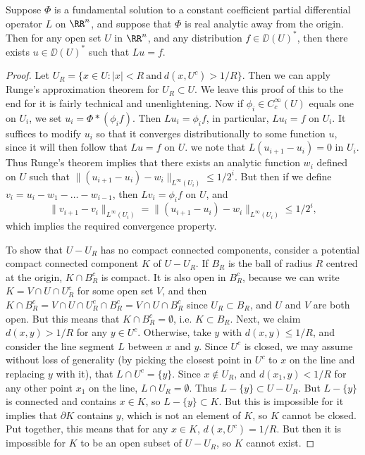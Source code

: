 \begin{theorem}
    Suppose $\Phi$ is a fundamental solution to a constant coefficient partial differential operator $L$ on $\RR^n$, and suppose that $\Phi$ is real analytic away from the origin. Then for any open set $U$ in $\RR^n$, and any distribution $f \in \DD(U)^*$, then there exists $u \in \DD(U)^*$ such that $Lu = f$.
\end{theorem}
\begin{proof}
    Let $U_R = \{ x \in U: |x| < R\ \text{and}\ d(x,U^c) > 1/R \}$. Then we can apply Runge's approximation theorem for $U_R \subset U$. We leave this proof of this to the end for it is fairly technical and unenlightening. Now if $\phi_i \in C_c^\infty(U)$ equals one on $U_i$, we set $u_i = \Phi * (\phi_i f)$. Then $Lu_i = \phi_i f$, in particular, $Lu_i = f$ on $U_i$. It suffices to modify $u_i$ so that it converges distributionally to some function $u$, since it will then follow that $Lu = f$ on $U$. we note that $L(u_{i+1} - u_i) = 0$ in $U_i$. Thus Runge's theorem implies that there exists an analytic function $w_i$ defined on $U$ such that $\| (u_{i+1} - u_i) - w_i \|_{L^\infty(U_i)} \leq 1/2^i$. But then if we define $v_i = u_i - w_1 - \dots - w_{i-1}$, then $Lv_i = \phi_i f$ on $U$, and
    \[ \| v_{i+1} - v_i \|_{L^\infty(U_i)} = \| (u_{i+1} - u_i) - w_i \|_{L^\infty(U_i)} \leq 1/2^i, \]
    which implies the required convergence property.

    To show that $U - U_R$ has no compact connected components, consider a potential compact connected component $K$ of $U - U_R$. If $B_R$ is the ball of radius $R$ centred at the origin, $K \cap B_R^c$ is compact. It is also open in $B_R^c$, because we can write $K = V \cap U \cap U_R^c$ for some open set $V$, and then $K \cap B_R^c = V \cap U \cap U_R^c \cap B_R^c = V \cap U \cap B_R^c$ since $U_R \subset B_R$, and $U$ and $V$ are both open. But this means that $K \cap B_R^c = \emptyset$, i.e. $K \subset B_R$. Next, we claim $d(x,y) > 1/R$ for any $y \in U^c$. Otherwise, take $y$ with $d(x,y) \leq 1/R$, and consider the line segment $L$ between $x$ and $y$. Since $U^c$ is closed, we may assume without loss of generality (by picking the closest point in $U^c$ to $x$ on the line and replacing $y$ with it), that $L \cap U^c = \{ y \}$. Since $x \not \in U_R$, and $d(x_1,y) < 1/R$ for any other point $x_1$ on the line, $L \cap U_R = \emptyset$. Thus $L - \{ y \} \subset U - U_R$. But $L - \{ y \}$ is connected and contains $x \in K$, so $L - \{ y \} \subset K$. But this is impossible for it implies that $\partial K$ contains $y$, which is not an element of $K$, so $K$ cannot be closed. Put together, this means that for any $x \in K$, $d(x,U^c) = 1/R$. But then it is impossible for $K$ to be an open subset of $U - U_R$, so $K$ cannot exist.
\end{proof}








